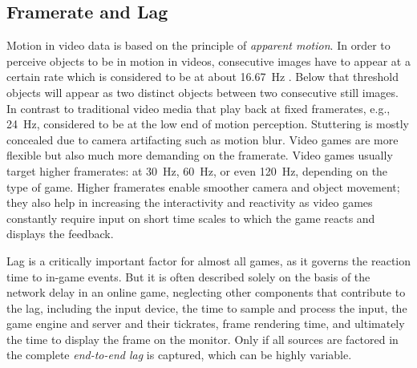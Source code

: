 \subsection{Framerate and Lag}
\label{sec:framerate}

Motion in video data is based on the principle of \textit{apparent motion}. In order to perceive objects to be in motion in videos, consecutive images have to appear at a certain rate which is considered to be at about \SI{16.67}{\hertz} \cite{wertheimer1912experimentelle}. Below that threshold objects will appear as two distinct objects between two consecutive still images. In contrast to traditional video media that play back at fixed framerates, e.g., \SI{24}{\hertz}, considered to be at the low end of motion perception. Stuttering is mostly concealed due to camera artifacting such as motion blur. Video games are more flexible but also much more demanding on the framerate. Video games usually target higher framerates: at \SI{30}{\hertz}, \SI{60}{\hertz}, or even \SI{120}{\hertz}, depending on the type of game. Higher framerates enable smoother camera and object movement; they also help in increasing the interactivity and reactivity as video games constantly require input on short time scales to which the game reacts and displays the feedback.

Lag is a critically important factor for almost all games, as it governs the reaction time to in-game events. But it is often described solely on the basis of the network delay in an online game, neglecting other components that contribute to the lag, including the input device, the time to sample and process the input, the game engine and server and their tickrates, frame rendering time, and ultimately the time to display the frame on the monitor. Only if all sources are factored in the complete \textit{end-to-end lag} is captured, which can be highly variable.




